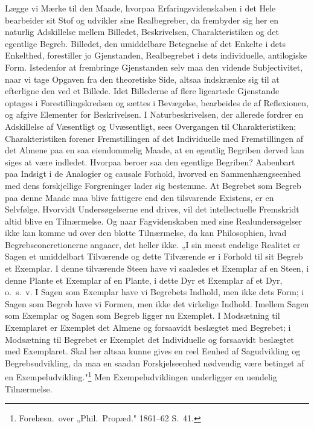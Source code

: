 \documentclass[12pt]{book}
\newcommand{\opage}[1]{\marginnote{\footnotesize\textit{[#1]}}}
\begin{document}
Lægge vi Mærke til den Maade, hvorpaa Erfaringsvidenskaben i det Hele bearbeider sit Stof og
udvikler sine Realbegreber, da frembyder sig her en naturlig Adskillelse mellem Billedet,
Beskrivelsen, Charakteristiken og det egentlige Begreb. Billedet, den umiddelbare Betegnelse af
det Enkelte i dets Enkelthed, forestiller jo Gjenstanden, Realbegrebet i dets individuelle,
antilogiske Form. Istedenfor at frembringe Gjenstanden selv maa den vidende Subjectivitet, naar vi
tage Opgaven fra den theoretiske Side, altsaa indskrænke sig til at efterligne den ved et Billede.
Idet Billederne af flere ligeartede Gjenstande optages i Forestillingskredsen og sættes i
Bevægelse, bearbeides de af Reflexionen, og afgive Elementer for Beskrivelsen. I Naturbeskrivelsen,
der allerede fordrer en Adskillelse af Væsentligt og Uvæsentligt, sees Overgangen til
Charakteristiken; Charakteristiken forener Fremstillingen af det Individuelle med Fremstillingen af
det Almene paa en saa eiendommelig Maade, at en egentlig Begriben derved kan siges at være
indledet. Hvorpaa beroer saa den egentlige Begriben? Aabenbart paa Indsigt i de Analogier og
causale Forhold, hvorved en Sammenhængseenhed med dens forskjellige Forgreninger lader sig
bestemme.
\opage{197} At Begrebet som Begreb paa denne Maade maa blive fattigere end den tilsvarende Existens, er en
Selvfølge. Hvorvidt Undersøgelserne end drives, vil det intellectuelle Fremskridt altid blive en
Tilnærmelse. Og naar Fagvidenskaben med sine Realundersøgelser ikke kan komme ud over den blotte
Tilnærmelse, da kan Philosophien, hvad Begrebsconcretionerne angaaer, det heller ikke. „I sin
meest endelige Realitet er Sagen et umiddelbart Tilværende og dette Tilværende er i Forhold til sit
Begreb et Exemplar. I denne tilværende Steen have vi saaledes et Exemplar af en Steen, i denne
Plante et Exemplar af en Plante, i dette Dyr et Exemplar af et Dyr, o.\ s.\ v. I Sagen som
Exemplar have vi Begrebets Indhold, men ikke dets Form; i Sagen som Begreb have vi Formen, men ikke
det virkelige Indhold. Imellem Sagen som Exemplar og Sagen som Begreb ligger nu Exemplet. I
Modsætning til Exemplaret er Exemplet det Almene og forsaavidt beslægtet med Begrebet; i Modsætning
til Begrebet er Exemplet det Individuelle og forsaavidt beslægtet med Exemplaret. Skal her altsaa
kunne gives en reel Eenhed af Sagudvikling og Begrebsudvikling, da maa en saadan Forskjelseenhed
nødvendig være betinget af en Exempeludvikling."\footnote{Forelæsn.\ over „Phil.\ Propæd."
1861--62 S.~41.} Men Exempeludviklingen underligger en uendelig Tilnærmelse.
\end{document}
